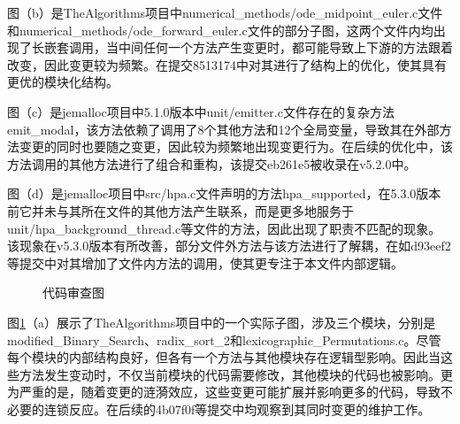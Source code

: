 图（b）是TheAlgorithms项目中numerical\_methods/ode\_midpoint\_euler.c文件和numerical\_methods/ode\_forward\_euler.c文件的部分子图，这两个文件内均出现了长嵌套调用，当中间任何一个方法产生变更时，都可能导致上下游的方法跟着改变，因此变更较为频繁。在提交8513174中对其进行了结构上的优化，使其具有更优的模块化结构。

图（c）是jemalloc项目中5.1.0版本中unit/emitter.c文件存在的复杂方法emit\_modal，该方法依赖了调用了8个其他方法和12个全局变量，导致其在外部方法变更的同时也要随之变更，因此较为频繁地出现变更行为。在后续的优化中，该方法调用的其他方法进行了组合和重构，该提交eb261e5被收录在v5.2.0中。

图（d）是jemalloc项目中src/hpa.c文件声明的方法hpa\_supported，在5.3.0版本前它并未与其所在文件的其他方法产生联系，而是更多地服务于unit/hpa\_background\_thread.c等文件的方法，因此出现了职责不匹配的现象。该现象在v5.3.0版本有所改善，部分文件外方法与该方法进行了解耦，在如d93eef2等提交中对其增加了文件内方法的调用，使其更专注于本文件内部逻辑。

\begin{figure}[!h]
    \setlength{\subfigcapskip}{-1bp}
    \centering
    \begin{minipage}{\textwidth}
    \centering
    \hspace{2em}
    \end{minipage}
    \vspace{0.2em}
    \caption{代码审查图} %
    \label{1_不良的逻辑型变更影响实例}
\end{figure}

图\ref{1_不良的逻辑型变更影响实例}（a）展示了TheAlgorithms项目中的一个实际子图，涉及三个模块，分别是modified\_Binary\_Search、radix\_sort\_2和lexicographic\_Permutations.c。尽管每个模块的内部结构良好，但各有一个方法与其他模块存在逻辑型影响。因此当这些方法发生变动时，不仅当前模块的代码需要修改，其他模块的代码也被影响。更为严重的是，随着变更的涟漪效应，这些变更可能扩展并影响更多的代码，导致不必要的连锁反应。在后续的4b07f0f等提交中均观察到其同时变更的维护工作。

